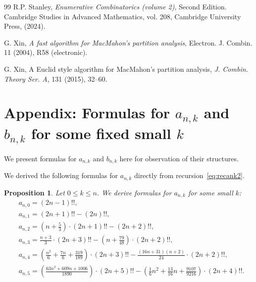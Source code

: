 \documentclass[reqno, 12pt]{article}
\newtheorem{prop}[thm]{Proposition}
\theoremstyle{mydefinition}
\theoremstyle{myremark}
\numberwithin{algorithm}{section}
\begin{document}
\begin{thebibliography}{99}
 R.P. Stanley, \emph{Enumerative Combinatorics (volume 2)}, Second Edition. Cambridge Studies in Advanced Mathematics, vol. 208, Cambridge University Press, (2024).

 G. Xin, \emph{A fast algorithm for MacMahon's partition analysis}, Electron. J. Combin. 11 (2004), R58 (electronic).

 G. Xin, A Euclid style algorithm for MacMahon's partition analysis, \emph{J. Combin. Theory Ser. A}, 131 (2015), 32--60.

\end{thebibliography}

\newpage
\appendix

\section{Appendix: Formulas for $a_{n,k}$ and $b_{n,k}$ for some fixed small $k$}
We present formulas for $a_{n,k}$ and $b_{n,k}$ here for observation of their structures.

We derived the following  formulas for $a_{n,k}$ directly from recursion~\eqref{eq:recank2}.
\begin{prop}\label{proposition-ank-init-term}
Let $0\leq k\leq n$.
We derive formulas for $a_{n,k}$ for some small $k$:
\begin{align*}
&a_{n,0}=(2n-1)!!,
\\& a_{n,1}=(2n+1)!!-(2n)!!,
\\& a_{n,2}=\left(n+\frac{5}{3}\right)\cdot (2n+1)!!-(2n+2)!!,
\\& a_{n,3}=\frac{n+3}{3}\cdot(2n+3)!!-\left(n+\frac{79}{48} \right)\cdot (2n+2)!!,
\\& a_{n,4}=\left(\frac{n^2}{6}+\frac{7n}{6}+\frac{319}{189} \right)\cdot (2n+3)!!-\frac{(16n+31)(n+2)}{24}\cdot (2n+2)!!,
\\& a_{n,5}=\left(\frac{63n^2+609n+1006}{1890}\right)\cdot (2n+5)!!-\left(\frac{1}{6} n^{2}+\frac{13}{16} n +\frac{9107}{9216}\right)\cdot (2n+4)!!.
\end{align*}
\end{prop}
\end{document}
